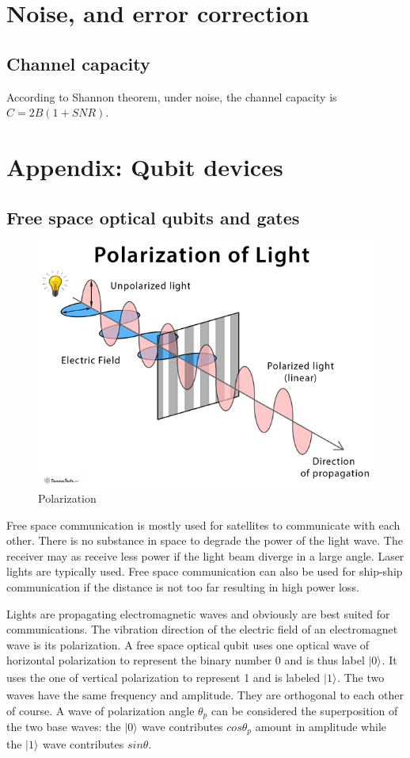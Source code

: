 \documentclass{book}
\newcommand{\keta}[2][]{\vert {#2} \rangle_{#1}}
\begin{document}
\chapter{Noise, and error correction}
\section{Channel capacity}
According to Shannon theorem, under noise, the channel capacity is $C = 2B (1+SNR)$.


\chapter{Appendix: Qubit devices}\label{A-qubit}

\section{Free space optical qubits and gates}
\begin{figure}[h]
\includegraphics[width=12cm]{pic/Polarization-of-Light.jpg}
\caption{Polarization}
\label{Polarizer}
\end{figure}

Free space communication is mostly used for satellites to communicate with each other. There is no substance in space to degrade the power of the light wave. The receiver may as receive less power if the light beam diverge in a large angle. Laser lights are typically used. Free space communication can also be used for ship-ship communication if the distance is not too far resulting in high power loss.

Lights are propagating electromagnetic waves and obviously are best suited for communications. The vibration direction of the electric field of an electromagnet wave is its polarization. A free space optical qubit uses one optical wave of horizontal polarization to represent the binary number 0 and is thus label $\keta{0}$. It uses the one of vertical polarization to represent 1 and is labeled $\keta{1}$. The two waves have the same frequency and amplitude. They are orthogonal to each other of course. A wave of polarization angle $\theta_p$ can be considered the superposition of the two base waves: the $\keta{0}$ wave contributes $cos\theta_p$ amount in amplitude while the $\keta{1}$ wave contributes $sin\theta$.
\end{document}
